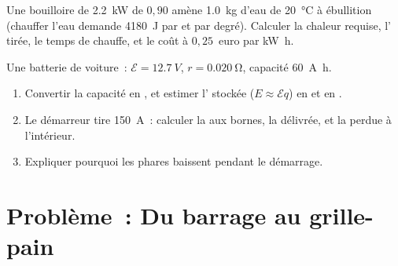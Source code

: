 \begin{exercise}[$\star\star\star$]\label{exo:g11:circuits-and-power:14}
Une bouilloire de \qty{2.2}{kW} de
 $0{,}90$ amène \qty{1.0}{kg}
d'eau de \qty{20}{\degreeCelsius} à ébullition (chauffer l'eau demande
\qty{4180}{J} par  et par degré).
Calculer la chaleur requise, l' tirée, le temps de chauffe, et le coût à $0{,}25$~euro par
\unit{kW.h}.
\end{exercise}

\begin{exercise}[$\star\star\star$]\label{exo:g11:circuits-and-power:15}
Une batterie de voiture~: $\mathcal{E} = \qty{12.7}{V}$,
$r = \qty{0.020}{\ohm}$, capacité \qty{60}{A.h}.
\begin{enumerate}
  \item Convertir la capacité en
        , et estimer
        l' stockée ($E \approx
        \mathcal{E} q$) en  et en
        .
  \item Le démarreur tire \qty{150}{A}~: calculer la
         aux bornes, la
         délivrée, et la
         perdue à l'intérieur.
  \item Expliquer pourquoi les phares baissent pendant le démarrage.
\end{enumerate}
\end{exercise}

\section{Problème~: Du barrage au grille-pain}

